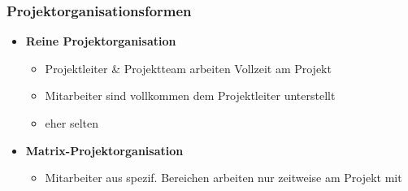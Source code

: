 \subsubsection{Projektorganisationsformen}
\begin{multicols}{3}
	\begin{itemize}
		\item \textbf{Reine Projektorganisation}
		\begin{itemize}
			\item Projektleiter \& Projektteam arbeiten Vollzeit am Projekt
			\item Mitarbeiter sind voll\-kommen dem Projektleiter \newline unterstellt
			\item eher selten
		\end{itemize}
		\item \textbf{Matrix-Projektorganisation}
		\begin{itemize}
			\item Mitarbeiter aus spezif. \newline Bereichen arbeiten nur zeitweise am Projekt mit

\end{itemize}
\end{itemize}
\end{multicols}
